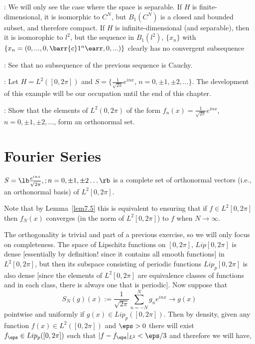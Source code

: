 \pru: 
We will only see the case where the space is separable.
If $H$ is finite-dimensional, it is isomorphic to $C^N$, but $B_1(C^N)$
is a closed and bounded subset, and therefore compact. 
If $H$ is infinite-dimensional (and separable), then it is isomorophic to
$l^2$, but the sequence in $B_1(l^2)$, $\{x_n\}$ with 
$\{x_n = (0,...,0,\barr{c} \\ 1\\ ^n \earr,0,...)\}$
clearly has no
convergent subsequence 
\epru
\espa

\ejer: See that no subsequence of the previous sequence is Cauchy.
\espa

\ejem:
Let $H= L^2 ([0,2\pi])$ and $S = \{\frac1{\sqrt{2\pi}}e^{inx}$, 
 $n=0, \pm 1, \pm 2,\ldots\}$. The development of this example will
be our occupation until the end of this chapter.
\espa

\ejer: Show that the elements of $L^2(0,2\pi)$ of the form 
$f_n(x) = \frac1{\sqrt{2\pi}} e^{inx}$, $n=0, \pm 1, \pm2, ...$,
form an orthonormal set.


\section{Fourier Series}


\bteo $S = \lb\frac{e^{inx}}{\sqrt{2\pi}},;n=0,\pm1,\pm2\ldots\rb$ is a complete set of orthonormal vectors (i.e., an orthonormal basis) of $L^2[0,2\pi]$. \eteo

Note that by Lemma~\ref{lem7.5} this is equivalent to ensuring that if $f \in L^2[0,2\pi]$ then $f_N(x)$ converges (in the norm of $L^2[0,2\pi]$) to $f$ when $N\to\infty$. \espa

\bpru 
The orthogonality is trivial and part of a previous exercise, so we will only focus on completeness. 
The space of Lipschitz functions on $[0,2\pi]$, $Lip[0,2\pi]$ is dense [essentially by definition! since it contains all smooth functions] in $L^2[0,2\pi]$, but then its subspace consisting of periodic functions $Lip_p[0,2\pi]$ is also dense [since the elements of $L^2[0,2\pi]$ are equivalence classes of functions and in each class, there is always one that is periodic]. 
Now suppose that \begin{equation} \label{eq:S_N} S_N(g)(x) := \frac{1}{\sqrt{2\pi}} \sum_{n=-N}^{N} g_n e^{inx} \to g(x) \end{equation} pointwise and uniformly if $g(x) \in Lip_p([0,2\pi])$. Then by density, given any function $f(x) \in L^2([0,2\pi])$ and $\eps > 0$ there will exist $f_{\eps} \in Lip_p([0,2\pi])$ such that $|f-f_{\eps}|_{L^2} < \eps/3$ and therefore we will have,

